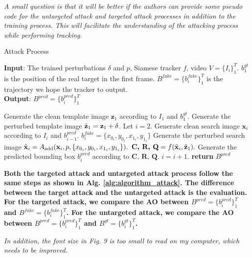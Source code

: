 \documentclass[12pt]{article}
\begin{document}
\textit{A small question is that it will be better if the authors can provide some pseudo code for the untargeted attack and targeted attack processes in addition to the training process. This will facilitate the understanding of the attacking process while performing tracking.}

\begin{algorithm}[t]
    \renewcommand\thealgorithm{2}
    \caption{Attack Process}
    \label{alg:algorithm_attack}
    \textbf{Input}: The trained perturbations $\delta$ and $p$, Siamese tracker $f$, video $V=\{I_i\}_1^T$. $b^{gt}_1$ is the position of the real target in the first frame. $B^{fake}=\{b^{fake}_i\}_1^{T}$ is the trajectory we hope the tracker to output.\\
    \textbf{Output}: $B^{pred}=\{b^{pred}_i\}_1^{T}$
    \begin{algorithmic}[1] %
      \STATE Generate the clean template image $\textbf{z}_1$ according to $I_1$ and $b^{gt}_1$.
      \STATE Generate the perturbed template image $\tilde{\textbf z}_1=\textbf z_1+\delta$.
      \STATE Let $i = 2$.
    \STATE Generate clean search image $\textbf{x}_i$ according to $I_i$ and $b^{pred}_{i-1}$.
    \STATE $b^{fake}_i=\{x_{0_i}, y_{0_i}, x_{1_i}, y_{1_i}\}$
    \STATE Generate the perturbed search image $\tilde{\textbf x}_i = A_{\text{add}}(\textbf x_i, p, \{x_{0_i}, y_{0_i}, x_{1_i}, y_{1_i}\}).$
    \STATE $\textbf{C, R, Q} = f(\tilde {\textbf x}_i, \tilde{\textbf z}_1).$
    \STATE Generate the predicted bounding box $b^{pred}_i$ according to $\textbf{C, R, Q}$.
    \STATE $i = i + 1.$
    \ENDWHILE
    \STATE \textbf{return} $B^{pred}$
    \end{algorithmic}
\end{algorithm}

\textbf{Both the targeted attack and untargeted attack process follow the same steps as shown in Alg. \ref{alg:algorithm_attack}. The difference between the target attack and the untargeted attack is the evaluation. For the targeted attack, we compare the AO between $B^{pred}=\{b^{pred}_i\}_1^{T}$ and $B^{fake}=\{b^{fake}_i\}_1^{T}$. For the untargeted attack, we compare the AO between $B^{pred}=\{b^{pred}_i\}_1^{T}$ and $B^{gt}=\{b^{gt}_i\}_1^{T}$.}

\textit{In addition, the font size in Fig. 9 is too small to read on my computer, which needs to be improved.}

\end{document}
